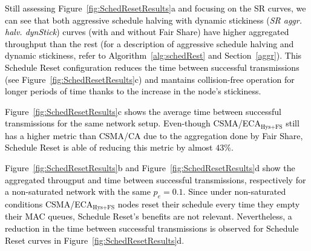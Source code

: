 	\textcolor{black}{Still assessing Figure~\ref{fig:SchedResetResults}a and focusing on the SR curves, we can see that both aggressive schedule halving with dynamic stickiness (\emph{SR aggr. halv. dynStick}) curves (with and without Fair Share) have higher aggregated throughput than the rest (for a description of aggressive schedule halving and dynamic stickiness, refer to Algorithm~\ref{alg:schedRest} and Section~\ref{aggr}). This Schedule Reset configuration reduces the time between successful transmissions (see Figure~\ref{fig:SchedResetResults}c) and mantains collision-free operation for longer periods of time thanks to the increase in the node's stickiness.}
	
	\textcolor{black}{Figure~\ref{fig:SchedResetResults}c shows the average time between successful transmissions for the same network setup. Even-though CSMA/ECA$_{\text{Hys+FS}}$ still has a higher metric than CSMA/CA due to the aggregation done by Fair Share, Schedule Reset is able of reducing this metric by almost $43\%$.}
	
	\textcolor{black}{Figure~\ref{fig:SchedResetResults}b and Figure~\ref{fig:SchedResetResults}d show the aggregated througput and time between successful transmissions, respectively for a non-saturated network with the same $p_e=0.1$. Since under non-saturated conditions CSMA/ECA$_{\text{Hys+FS}}$ nodes reset their schedule every time they empty their MAC queues, Schedule Reset's benefits are not relevant. Nevertheless, a reduction in the time between successful transmissions is observed for Schedule Reset curves in Figure~\ref{fig:SchedResetResults}d}.
	
	
	
%	
